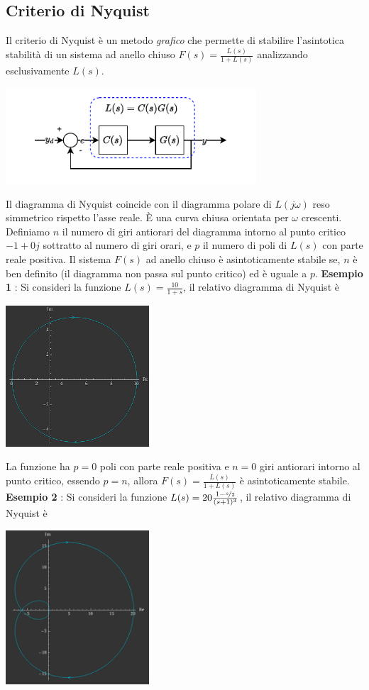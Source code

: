 \documentclass[10pt, letterpaper]{report}
\begin{document}
\subsection{Criterio di Nyquist}
Il criterio di Nyquist è un metodo \textit{grafico} che permette di stabilire l'asintotica stabilità di un sistema ad anello chiuso $F(s)=\frac{L(s)}{1+L(s)}$ analizzando esclusivamente $L(s)$.\begin{center}
    \includegraphics[width=0.7\textwidth ]{images/ls.pdf}
 \end{center}
Il diagramma di Nyquist coincide con il diagramma polare di $L(j\omega)$ reso simmetrico rispetto l'asse reale. È una curva chiusa orientata per $\omega$ crescenti. Definiamo $n$ il numero di giri antiorari del diagramma intorno al punto critico $-1+0j$ sottratto al numero di giri orari, e $p$ il numero di poli di $L(s)$ con parte reale positiva. Il sistema $F(s)$ ad anello chiuso è asintoticamente stabile se, $n$ è ben definito (il diagramma non passa sul punto critico) ed è uguale a $p$.\acc
\textbf{Esempio 1 } : Si consideri la funzione $L(s)=\frac{10}{1+s}$, il relativo diagramma di Nyquist è 
\begin{center}
    \includegraphics[width=0.4\textwidth ]{images/nyquist1.png}
 \end{center}
La funzione ha $p=0$ poli con parte reale positiva e $n=0$ giri antiorari intorno al punto critico, essendo $p=n$, allora $F(s)=\frac{L(s)}{1+L(s)}$ è asintoticamente stabile.\acc
\textbf{Esempio 2} : Si consideri la funzione $L(s)=20\frac{1-\nicefrac{s}{2}}{(s+1)^3}$, il relativo diagramma di Nyquist è 
\begin{center}
    \includegraphics[width=0.4\textwidth ]{images/nyquist2.png}
 \end{center}
\end{document}

